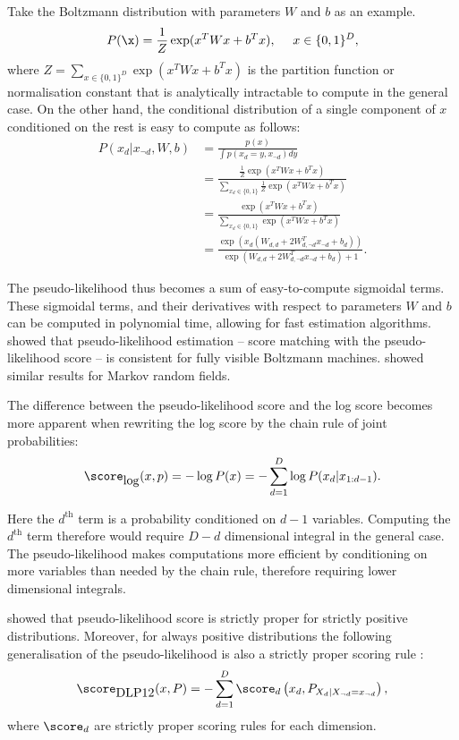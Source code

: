 Take the Boltzmann distribution with parameters $W$ and $b$ as an example. 
%
\begin{equation}
	P(\x) = \frac{1}{Z}\exp(x^{T}Wx + b^{T}x),\ \ \ \ x\in\{0,1\}^D,
\end{equation}
%
where $Z = \sum_{x\in\{0,1\}^D}\exp(x^{T}Wx + b^{T}x)$ is the partition function or normalisation constant that is analytically intractable to compute in the general case. On the other hand, the conditional distribution of a single component of $x$ conditioned on the rest is easy to compute as follows:
%
\begin{align}
	P(x_d\vert x_{\neg d}, W, b) &= \frac{p(x)}{\int p(x_d=y,x_{\neg d}) dy}\\
		&= \frac{\frac{1}{Z}\exp(x^{T}Wx + b^{T}x)}{\sum_{x_d\in\{0,1\}}\frac{1}{Z}\exp(x^{T}Wx + b^{T}x)}\\
		&= \frac{\exp(x^{T}Wx + b^{T}x)}{\sum_{x_d\in\{0,1\}}\exp(x^{T}Wx + b^{T}x)}\\
		&= \frac{\exp\left( x_d \left( W_{d,d} + 2 W_{d,\neg d}^{T}x_{\neg d} + b_d \right)\right)}{\exp( W_{d,d} + 2 W_{d,\neg d}^{T}x_{\neg d} + b_{d}) + 1}.
\end{align}

The pseudo-likelihood thus becomes a sum of easy-to-compute sigmoidal terms. These sigmoidal terms, and their derivatives with respect to parameters $W$ and $b$ can be computed in polynomial time, allowing for fast estimation algorithms. \citet{Hyvarinen2006} showed that pseudo-likelihood estimation -- score matching with the pseudo-likelihood score -- is consistent for fully visible Boltzmann machines. \citet{Besag1977,Comets1992} showed similar results for Markov random fields.

The difference between the pseudo-likelihood score and the log score becomes more apparent when rewriting the log score by the chain rule of joint probabilities:
%
\begin{equation}
	\score_{\mbox{log}}(x,p) = - \log P(x) =  - \sum_{d=1}^{D} \log P(x_d\vert x_{1:d-1}).
\end{equation}

Here the $d^{\mbox{th}}$ term is a probability conditioned on $d-1$ variables. Computing the $d^{\mbox{th}}$ term therefore would require $D-d$ dimensional integral in the general case. The pseudo-likelihood makes computations more efficient by conditioning on more variables than needed by the chain rule, therefore requiring lower dimensional integrals.

\citet{Csiszar2004} showed that pseudo-likelihood score is strictly proper for strictly positive distributions. Moreover, for always positive distributions the following generalisation of the pseudo-likelihood is also a strictly proper scoring rule \citep*{Dawid2012}:
%
\begin{equation}
	\score_{\mbox{DLP12}}(x,P) = - \sum_{d=1}^{D} \score_d\left(x_d, P_{X_d \vert X_{\neg d}=x_{\neg d}}\right),
\end{equation}
%
where $\score_d$ are strictly proper scoring rules for each dimension.

